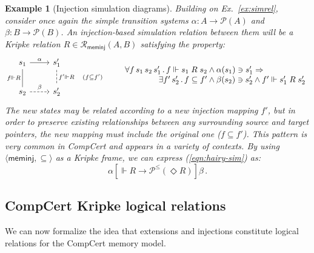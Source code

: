 \documentclass[draft,11pt]{report}
\newtheorem{example}[theorem]{Example}
\theoremstyle{definition}
\newcommand{\kw}[1]{\ensuremath{ \mathsf{#1} }}
\newcommand{\ifr}[1]{\mathrel{[{#1}]}}
\begin{document}
\begin{example}[Injection simulation diagrams] \label{ex:sim} %
Building on Ex.~\ref{ex:simrel},
consider once again the simple transition systems
$\alpha : A \rightarrow \mathcal{P}(A)$ and
$\beta : B \rightarrow \mathcal{P}(B)$.
An injection-based simulation relation between them
will be a Kripke relation
$R \in \mathcal{R}_\kw{meminj}(A, B)$
satisfying the property:
\begin{equation}
    \label{eqn:hairy-sim}
  \begin{tikzcd}[scale=0.8]
    s_1 \arrow[r, "\alpha"]
        \arrow[d, dash, "f \Vdash R"'] &
    s_1' \arrow[d, dashed, dash, "f' \Vdash R \quad (f \subseteq f')"] \\
    s_2 \arrow[r, dashed, "\beta"] &
    s_2'
  \end{tikzcd}
  \qquad
    \begin{array}{r@{}l}
    \forall f \, s_1 \, s_2 \, s_1' \,.\,
      f \Vdash s_1 \mathrel{R} s_2 &{} \wedge
      \alpha(s_1) \ni s_1' \Rightarrow \\
    \exists f' \, s_2' \,.\,
      f \subseteq f' &{} \wedge
      \beta(s_2) \ni s_2' \wedge
      f' \Vdash s_1' \mathrel{R} s_2'
    \end{array}
\end{equation}
The new states may be related according to
a new injection mapping $f'$,
but in order to preserve existing relationships
between any surrounding source and target pointers,
the new mapping must include
the original one ($f \subseteq f'$).
This pattern is very common in CompCert
and appears in a variety of contexts.
By using $\langle \kw{meminj}, {\subseteq} \rangle$
as a Kripke frame,
we can express
(\ref{eqn:hairy-sim}) as:
\[
  \alpha \ifr{\Vdash R \rightarrow \mathcal{P}^\le(\Diamond R)} \beta \,.
\]
\end{example}


\subsection{CompCert Kripke logical relations} \label{sec:cklrdef} %

We can now formalize the idea that
extensions and injections
constitute logical relations for the CompCert memory model.
\end{document}
